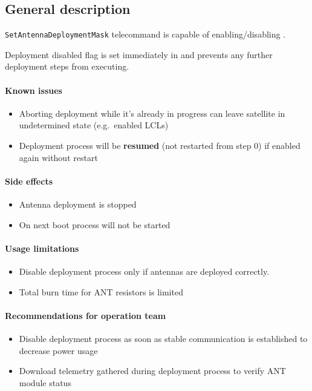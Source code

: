

\subsection{General description}
\texttt{SetAntennaDeploymentMask} telecommand is capable of enabling/disabling .

Deployment disabled flag is set immediately in  and prevents any further deployment steps from executing.

\paragraph{Known issues}
\begin{itemize}
	\item Aborting deployment while it's already in progress can leave satellite in undetermined state (e.g.\ enabled LCLs)
	\item Deployment process will be \textbf{resumed} (not restarted from step 0) if enabled again without \OBC restart
\end{itemize}

\paragraph{Side effects}
\begin{itemize}
	\item Antenna deployment is stopped
	\item On next \OBC boot process will not be started
\end{itemize}

\paragraph{Usage limitations} 
\begin{itemize}
	\item Disable deployment process only if antennas are deployed correctly. 
	\item Total burn time for ANT resistors is limited
\end{itemize}

\paragraph{Recommendations for operation team} 
\begin{itemize}
	\item Disable deployment process as soon as stable communication is established to decrease power usage
	\item Download telemetry gathered during deployment process to verify ANT module status
\end{itemize}

